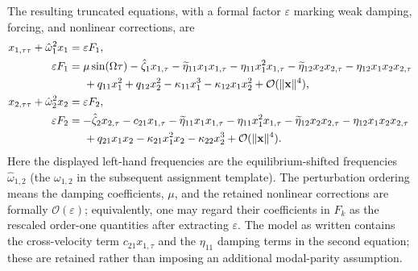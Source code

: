\documentclass[11pt]{article}
\begin{document}
The resulting truncated equations, with a formal factor $\varepsilon$ marking weak damping, forcing, and nonlinear corrections, are
\begin{align}
x_{1,\tau\tau}+\hat\omega_1^2x_1&=\varepsilon F_1,\nonumber\\
\varepsilon F_1&=\mu\sin(\Omega\tau)-\hat\zeta_1x_{1,\tau}-\widetilde\eta_{11}x_1x_{1,\tau}-\eta_{11}x_1^2x_{1,\tau}-\widetilde\eta_{12}x_2x_{2,\tau}-\eta_{12}x_1x_2x_{2,\tau}\nonumber\\
&\hspace{1.4em}+q_{11}x_1^2+q_{12}x_2^2-\kappa_{11}x_1^3-\kappa_{12}x_1x_2^2+\mathcal{O}(\|\mathbf{x}\|^4),\label{eq:F1-expanded}\\
x_{2,\tau\tau}+\hat\omega_2^2x_2&=\varepsilon F_2,\nonumber\\
\varepsilon F_2&=-\hat\zeta_2x_{2,\tau}-c_{21}x_{1,\tau}-\widetilde\eta_{11}x_1x_{1,\tau}-\eta_{11}x_1^2x_{1,\tau}-\widetilde\eta_{12}x_2x_{2,\tau}-\eta_{12}x_1x_2x_{2,\tau}\nonumber\\
&\hspace{1.4em}+q_{21}x_1x_2-\kappa_{21}x_1^2x_2-\kappa_{22}x_2^3+\mathcal{O}(\|\mathbf{x}\|^4).\label{eq:F2-expanded}
\end{align}
Here the displayed left-hand frequencies are the equilibrium-shifted frequencies $\hat\omega_{1,2}$ (the $\omega_{1,2}$ in the subsequent assignment template). The perturbation ordering means the damping coefficients, $\mu$, and the retained nonlinear corrections are formally $\mathcal{O}(\varepsilon)$; equivalently, one may regard their coefficients in $F_k$ as the rescaled order-one quantities after extracting $\varepsilon$. The model as written contains the cross-velocity term $c_{21}x_{1,\tau}$ and the $\eta_{11}$ damping terms in the second equation; these are retained rather than imposing an additional modal-parity assumption.
\end{document}
